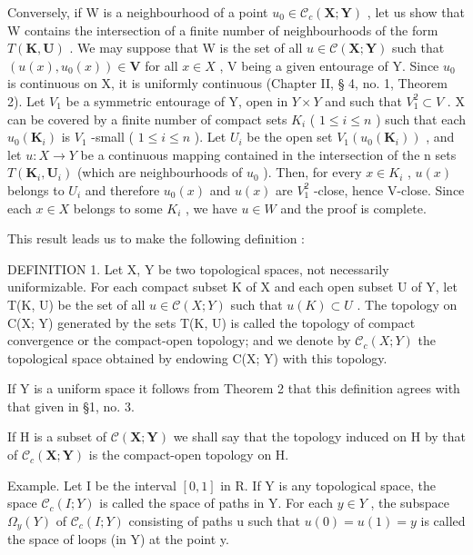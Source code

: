 Conversely, if W is a neighbourhood of a point \(u_{0} \in \mathcal{C}_{c}(\mathbf{X}; \mathbf{Y})\) , let us show that W contains the intersection of a finite number of neighbourhoods of the form \(T(\mathbf{K}, \mathbf{U})\) . We may suppose that W is the set of all \(u \in \mathcal{C}(\mathbf{X}; \mathbf{Y})\) such that \((u(x), u_{0}(x)) \in \mathbf{V}\) for all \(x \in X\) , V being a given entourage of Y. Since \(u_{0}\) is continuous on X, it is uniformly continuous (Chapter II, § 4, no. 1, Theorem 2). Let \(V_{1}\) be a symmetric entourage of Y, open in \(Y \times Y\) and such that \(V_{1}^{2} \subset V\) . X can be covered by a finite number of compact sets \(K_{i}\) ( \(1 \leqslant i \leqslant n\) ) such that each \(u_{0}(\mathbf{K}_{i})\) is \(V_{1}\) -small ( \(1 \leqslant i \leqslant n\) ). Let \(U_{i}\) be the open set \(V_{1}(u_{0}(\mathbf{K}_{i}))\) , and let \(u: X \to Y\) be a continuous mapping contained in the intersection of the n sets \(T(\mathbf{K}_{i}, \mathbf{U}_{i})\) (which are neighbourhoods of \(u_{0}\) ). Then, for every \(x \in K_{i}\) , \(u(x)\) belongs to \(U_{i}\) and therefore \(u_{0}(x)\) and \(u(x)\) are \(V_{1}^{2}\) -close, hence V-close. Since each \(x \in X\) belongs to some \(K_{i}\) , we have \(u \in W\) and the proof is complete.

This result leads us to make the following definition :

DEFINITION 1. Let X, Y be two topological spaces, not necessarily uniformizable. For each compact subset K of X and each open subset U of Y, let T(K, U) be the set of all \(u \in \mathcal{C}(X; Y)\) such that \(u(K) \subset U\) . The topology on C(X; Y) generated by the sets T(K, U) is called the topology of compact convergence or the compact-open topology; and we denote by \(\mathcal{C}_{c}(X; Y)\) the topological space obtained by endowing C(X; Y) with this topology.

If Y is a uniform space it follows from Theorem 2 that this definition agrees with that given in §1, no. 3.

If H is a subset of \(\mathcal{C}(\mathbf{X};\mathbf{Y})\) we shall say that the topology induced on H by that of \(\mathcal{C}_{c}(\mathbf{X};\mathbf{Y})\) is the compact-open topology on H.

Example. Let I be the interval \([0, 1]\) in R. If Y is any topological space, the space \(\mathcal{C}_{c}(I; Y)\) is called the space of paths in Y. For each \(y \in Y\) , the subspace \(\Omega_{y}(Y)\) of \(\mathcal{C}_{c}(I; Y)\) consisting of paths u such that \(u(0) = u(1) = y\) is called the space of loops (in Y) at the point y.

